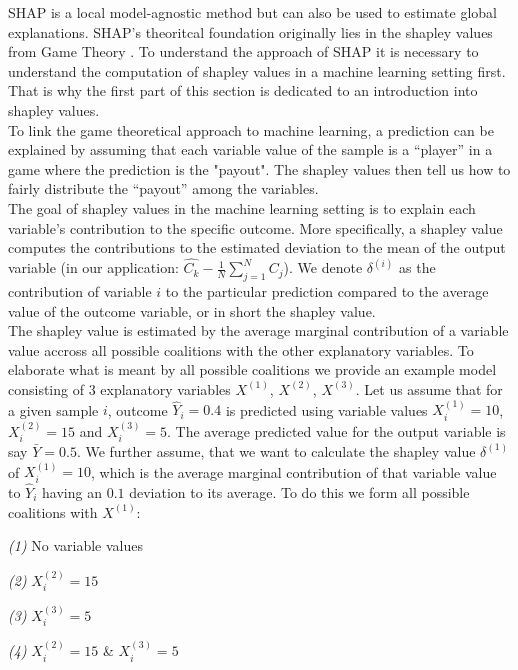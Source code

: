 \documentclass[12pt,titlepage]{article}
\begin{document}
SHAP is a local model-agnostic method but can also be used to estimate global explanations. SHAP's theoritcal foundation originally lies in the shapley values from Game Theory \cite{shapley}. To understand the approach of SHAP it is necessary to understand the computation of shapley values in a machine learning setting first. That is why the first part of this section is dedicated to an introduction into shapley values. \\
To link the game theoretical approach to machine learning, a prediction can be explained by assuming that each variable value of the sample is a “player” in a game where the prediction is the "payout". The shapley values then tell us how to fairly distribute the “payout” among the variables. \\
The goal of shapley values in the machine learning setting is to explain each variable's contribution to the specific outcome. More specifically, a shapley value computes the contributions to the estimated deviation to the mean of the output variable (in our application: $\hat{C_{k}} - \frac{1}{N} \sum_{j=1}^{N} C_{j}$). We denote $\delta^{(i)}$ as the contribution of variable $i$ to the particular prediction compared to the average value of the outcome variable, or in short the shapley value. \\
The shapley value is estimated by the average marginal contribution of a variable value accross all possible coalitions with the other explanatory variables. To elaborate what is meant by all possible coalitions we provide an example model consisting of 3 explanatory variables $X^{(1)}$, $X^{(2)}$, $X^{(3)}$. Let us assume that for a given sample $i$, outcome $\hat{Y}_{i}=0.4$ is predicted using variable values $X^{(1)}_{i}=10$, $X^{(2)}_{i}=15$ and $X^{(3)}_{i}=5$. The average predicted value for the output variable is say $\bar Y = 0.5$. We further assume, that we want to calculate the shapley value $\delta^{(1)}$ of $X^{(1)}_{i}=10$, which is the average marginal contribution of that variable value to $\hat{Y}_{i}$ having an $0.1$ deviation to its average. To do this we form all possible coalitions with $X^{(1)}$:

\vspace{3mm}
\textit{(1)} No variable values \par
\textit{(2)} $X^{(2)}_{i}=15$ \par
\textit{(3)} $X^{(3)}_{i}=5$\par
\textit{(4)} $X^{(2)}_{i}=15$ \& $X^{(3)}_{i}=5$ \\
\vspace{1mm}
\end{document}
